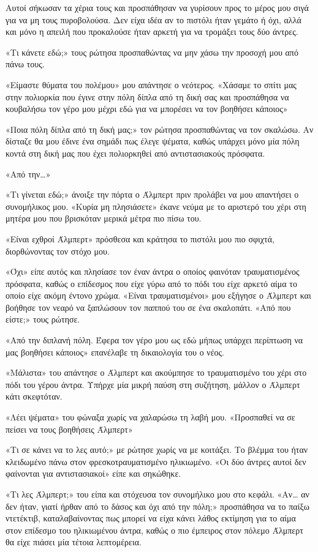 \documentclass[12pt,twoside, openany]{book}
\begin{document}
Αυτοί σήκωσαν τα χέρια τους και προσπάθησαν να γυρίσουν προς το μέρος μου σιγά για να μη τους πυροβολούσα. Δεν είχα ιδέα αν το πιστόλι ήταν γεμάτο ή όχι, αλλά και μόνο η απειλή που προκαλούσε ήταν αρκετή για να τρομάξει τους δύο άντρες.

«Τι κάνετε εδώ;» τους ρώτησα προσπαθώντας να μην χάσω την προσοχή μου από πάνω τους.

«Είμαστε θύματα του πολέμου» μου απάντησε ο νεότερος. «Χάσαμε το σπίτι μας στην πολιορκία που έγινε στην πόλη δίπλα από τη δική σας και προσπάθησα να κουβαλήσω τον γέρο μου μέχρι εδώ για να μπορέσει να τον βοηθήσει κάποιος»

«Ποια πόλη δίπλα από τη δική μας;» τον ρώτησα προσπαθώντας να τον σκαλώσω. Αν δίσταζε θα μου έδινε ένα σημάδι πως έλεγε ψέματα, καθώς υπάρχει μόνο μία πόλη κοντά στη δική μας που έχει πολιορκηθεί από αντιστασιακούς πρόσφατα.

«Από την…»

«Τι γίνεται εδώ;» άνοιξε την πόρτα ο Άλμπερτ πριν προλάβει να μου απαντήσει ο συνομήλικος μου. «Κυρία μη πλησιάσετε» έκανε νεύμα με το αριστερό του χέρι στη μητέρα μου που βρισκόταν μερικά μέτρα πιο πίσω του.

«Είναι εχθροί Άλμπερτ» πρόσθεσα και κράτησα το πιστόλι μου πιο σφιχτά, διορθώνοντας τον στόχο μου.

«Όχι» είπε αυτός και πλησίασε τον έναν άντρα ο οποίος φαινόταν τραυματισμένος πρόσφατα, καθώς ο επίδεσμος που είχε γύρω από το πόδι του είχε αρκετό αίμα το οποίο είχε ακόμη έντονο χρώμα. «Είναι τραυματισμένοι» μου εξήγησε ο Άλμπερτ και βοήθησε τον νεαρό να ξαπλώσουν τον παππού του σε ένα σκαλοπάτι. «Από που είστε;» τους ρώτησε.

«Από την διπλανή πόλη. Έφερα τον γέρο μου ως εδώ μήπως υπάρχει περίπτωση να μας βοηθήσει κάποιος» επανέλαβε τη δικαιολογία του ο νέος.

«Μάλιστα» του απάντησε ο Άλμπερτ και ακούμπησε το τραυματισμένο του χέρι στο πόδι του γέρου άντρα. Υπήρχε μία μικρή παύση στη συζήτηση, μάλλον ο Άλμπερτ κάτι σκεφτόταν.

«Λέει ψέματα» του φώναξα χωρίς να χαλαρώσω τη λαβή μου. «Προσπαθεί να σε πείσει να τους βοηθήσεις Άλμπερτ»

«Τι σε κάνει να το λες αυτό;» με ρώτησε χωρίς να με κοιτάξει. Το βλέμμα του ήταν κλειδωμένο πάνω στον φρεσκοτραυματισμένο ηλικιωμένο. «Οι δύο άντρες αυτοί δεν φαίνονται για αντιστασιακοί» είπε και σηκώθηκε.

«Τι λες Άλμπερτ;» του είπα και στόχευσα τον συνομήλικο μου στο κεφάλι. «Αν… αν δεν ήταν, γιατί ήρθαν από το δάσος και όχι από την πόλη;» προσπάθησα να το παίξω ντετέκτιβ, καταλαβαίνοντας πως μπορεί να είχα κάνει λάθος εκτίμηση για το αίμα στον επίδεσμο του ηλικιωμένου άντρα, καθώς ο πιο έμπειρος στον πόλεμο Άλμπερτ θα είχε πιάσει μία τέτοια λεπτομέρεια.
\end{document}
